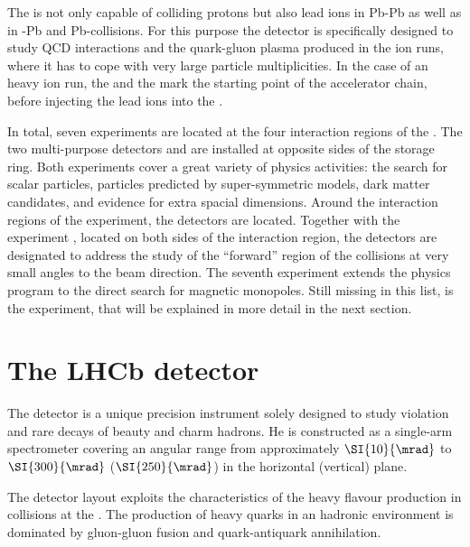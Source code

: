 The \LHC is not only capable of colliding protons but also lead ions in Pb-Pb
as well as in \proton-Pb and Pb-\proton collisions. For this purpose the \ALICE
detector \cite{Aamodt:2008zz} is specifically designed to study QCD interactions
and the quark-gluon plasma produced in the \LHC ion runs, where it has to cope
with very large particle multiplicities. In the case of an heavy ion run, the
\LINACThree and the \LEIR mark the starting point of the accelerator chain,
before injecting the lead ions into the \PSyn.

In total, seven experiments are located at the four interaction regions of the
\LHC. The two multi-purpose detectors \ATLAS \cite{Aad:2008zzm} and \CMS
\cite{Chatrchyan:2008aa} are installed at opposite sides of the storage ring.
Both experiments cover a great variety of physics activities: the search for
scalar particles, particles predicted by super-symmetric models, dark matter
candidates, and evidence for extra spacial dimensions. Around the interaction
regions of the \CMS experiment, the \TOTEM detectors \cite{Anelli:2008zza} are
located. Together with the \LHCf experiment \cite{Adriani:2008zz}, located on
both sides of the \ATLAS interaction region, the detectors are designated to
address the study of the \enquote{forward} region of the collisions at very
small angles to the beam direction. The seventh experiment \MoEDAL extends the
\LHC physics program to the direct search for magnetic monopoles. Still missing
in this list, is the \LHCb experiment, that will be explained in more detail in
the next section.


\section{The LHCb detector}
\label{sec:lhcb_experiment:detector}

The \LHCb detector is a unique precision instrument solely designed to study \CP
violation and rare decays of beauty and charm hadrons. He is constructed as a
single-arm spectrometer covering an angular range from approximately
$\SI{10}{\mrad}$ to $\SI{300}{\mrad}$ ($\SI{250}{\mrad}$) in the
horizontal (vertical) plane.

The detector layout exploits the characteristics of the heavy flavour production
in \protonproton collisions at the \LHC. The production of heavy quarks in an
hadronic environment is dominated by gluon-gluon fusion and quark-antiquark
annihilation.

